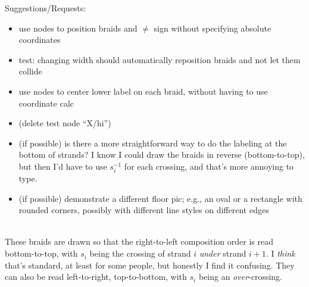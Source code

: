 \documentclass{article}
\begin{document}
Suggestions/Requests:
\begin{itemize}
\item use nodes to position braids and $\not =$ sign without specifying absolute coordinates
\item test: changing width should automatically reposition braids and not let them collide
\item use nodes to center lower label on each braid, without having to use coordinate calc
\item (delete test node ``X/hi'')
\item (if possible) is there a more straightforward way to do the labeling at the bottom of strands?  I know I could draw the braids in reverse (bottom-to-top), but then I'd have to use $s^{-1}_i$ for each crossing, and that's more annoying to type. 
\item (if possible) demonstrate a different floor pic; e.g., an oval or a rectangle with rounded corners, possibly with different line styles on different edges
\end{itemize}
\ \\

These braids are drawn so that the right-to-left composition order is read bottom-to-top, with $s_i$ being the crossing of strand $i$ \emph{under} strand $i+1$.
I \emph{think} that's standard, at least for some people, but honestly I find it confusing.
They can also be read left-to-right, top-to-bottom, with $s_i$ being an \emph{over}-crossing.\\

\end{document}
